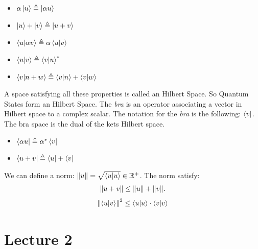 \documentclass{article}
\begin{document}
\begin{itemize}

\item $\alpha \ket{u} \triangleq \ket{\alpha u}$

\item $ \ket{u} + \ket{v} \triangleq \ket{u+v}$

\item $ \bra{u} \ket{\alpha v} \triangleq \alpha \bra{u} \ket{v} $

\item $ \bra{u}\ket{v} \triangleq \bra{v}\ket{u}^*$

\item $\bra{v}\ket{n+w} \triangleq \bra{v}\ket{n} + \bra{v}\ket{w}$ 

\end{itemize}
A space satisfying all these properties is called an Hilbert Space. So Quantum States form an Hilbert Space.
The \emph{bra} is an operator associating a vector in Hilbert space to a complex scalar. The notation for the \emph{bra} is the following: $\bra{v}$. The bra space is the dual of the kets Hilbert space.
\begin{itemize}

\item  $\bra{\alpha u} \triangleq \alpha^* \bra{v}  $ 

\item $ \bra{u+v} \triangleq \bra{u} + \bra{v}$

\end{itemize}
We can define a norm: $\norm{u} = \sqrt{\bra{u}\ket{u}}\in \mathbb{R^+}$.
The norm satisfy: 
$$\norm{u+v} \leq \norm{u} + \norm{v}. $$
$$\norm{ \bra{u}\ket{v}}^2 \leq \bra{u}\ket{u}  \cdot \bra{v}\ket{v}$$

\section{Lecture 2}
\end{document}
